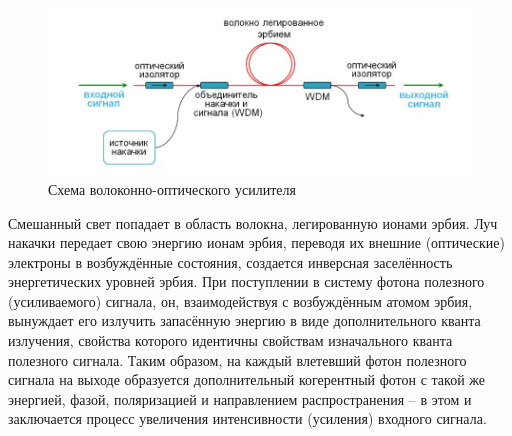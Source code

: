 \documentclass[12pt,a4paper]{article}
\begin{document}
	\begin{figure}[h!]
		\centering
		\includegraphics[width=0.80\linewidth]{erb_3.jpg}
		\caption{Схема волоконно-оптического усилителя}
		\label{lab}
	\end{figure}
		
Смешанный свет попадает в область волокна, легированную ионами
эрбия. Луч накачки передает свою энергию ионам эрбия, переводя их
внешние (оптические) электроны в возбуждённые состояния, создается
инверсная заселённость энергетических уровней эрбия. При поступлении
в систему фотона полезного (усиливаемого) сигнала, он, взаимодействуя с
возбуждённым атомом эрбия, вынуждает его излучить запасённую
энергию в виде дополнительного кванта излучения, свойства которого
идентичны свойствам изначального кванта полезного сигнала. Таким
образом, на каждый влетевший фотон полезного сигнала на выходе
образуется дополнительный когерентный фотон с такой же энергией,
фазой, поляризацией и направлением распространения – в этом и
заключается процесс увеличения интенсивности (усиления) входного
сигнала.
\end{document}
